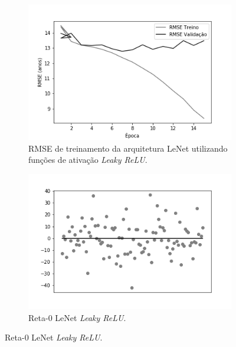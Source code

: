 \begin{figure}[hb!]
\begin{subfigure}[hb]{0.5\linewidth}
	\end{subfigure}\\
  \begin{subfigure}[hb]{0.5\linewidth}
    \caption{RMSE de treinamento da arquitetura LeNet utilizando funções de ativação \emph{Leaky ReLU}.}
    \label{fig:redeneuralbiologica}
    \includegraphics[width=\linewidth]{img/graficos-fase2/fig-history-lenet-lrelu-data-augmentation-2-2.png}
  \end{subfigure}
	\begin{subfigure}[hb]{0.5\linewidth}
		\caption{Reta-0 LeNet \emph{Leaky ReLU}.}
		\label{fig:redeneuralbiologica}
	 \includegraphics[width=\linewidth]{img/graficos-fase2/fig-reta-0-lenetregressor-lrelu-data-augmentation-2-2.png}
	\end{subfigure}%
\end{figure}

